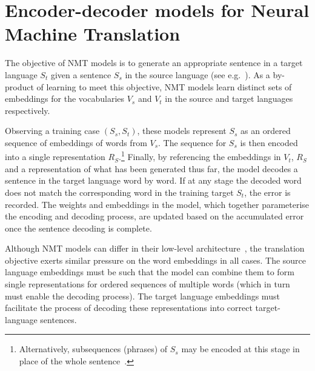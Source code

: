 \section{Encoder-decoder models for Neural Machine Translation}

The objective of NMT models is to generate an appropriate sentence in a target language \(S_t\)  given a sentence \(S_s\) in the source language (see e.g.~\citep{kalchbrenner13emnlp,Sutskever2014sequence}). As a by-product of learning to meet this objective, NMT models learn distinct sets of embeddings for the vocabularies \(V_ s\) and \(V_t\) in the source and target languages respectively.

Observing a training case \((S_s, S_t)\), these models represent \(S_s\) as an ordered sequence of embeddings of words from \(V_s\). The sequence for \(S_s\) is then encoded into a single representation \(R_S\).\footnote{Alternatively, subsequences (phrases) of \(S_s\) may be encoded at this stage in place of the whole sentence~\citep{bahdanau2014neural}.} Finally, by referencing the embeddings in \(V_t\), \(R_S\) and a representation of what has been generated thus far, the model decodes a sentence in the target language word by word. If at any stage the decoded word does not match the corresponding word in the training target \(S_t\), the error is recorded. The weights and embeddings in the model, which together parameterise the encoding and decoding process, are updated based on the accumulated error once the sentence decoding is complete. 

Although NMT models can differ in their low-level architecture~\citep{kalchbrenner13emnlp,Cho2014,bahdanau2014neural}, the translation objective exerts similar pressure on the word embeddings in all cases. The source language embeddings must be such that the model can combine them to form single representations for ordered sequences of multiple words (which in turn must enable the decoding process). The target language embeddings must facilitate the process of decoding these representations into correct target-language sentences.    


